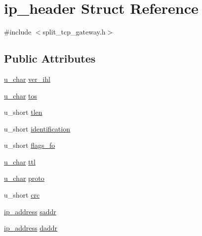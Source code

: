 \hypertarget{structip__header}{\section{ip\-\_\-header \-Struct \-Reference}
\label{structip__header}
}


{\ttfamily \#include $<$split\-\_\-tcp\-\_\-gateway.\-h$>$}

\subsection*{\-Public \-Attributes}
\begin{DoxyCompactItemize}
\item 
\hyperlink{split__tcp__gateway_8h_ae2b02ed168fc99cff3851603910b1fb6}{u\-\_\-char} \hyperlink{structip__header_a5eb344fea96865ef5757d712a23274b4}{ver\-\_\-ihl}
\item 
\hyperlink{split__tcp__gateway_8h_ae2b02ed168fc99cff3851603910b1fb6}{u\-\_\-char} \hyperlink{structip__header_a14c3d2a74ce954f35be8c4353122c188}{tos}
\item 
u\-\_\-short \hyperlink{structip__header_a551538f84a5cdac3e0accc9551c22793}{tlen}
\item 
u\-\_\-short \hyperlink{structip__header_a076993a245f166daecc00e5526d1e3a1}{identification}
\item 
u\-\_\-short \hyperlink{structip__header_ac55a50eeceb2167dc1e13b12b4644920}{flags\-\_\-fo}
\item 
\hyperlink{split__tcp__gateway_8h_ae2b02ed168fc99cff3851603910b1fb6}{u\-\_\-char} \hyperlink{structip__header_aefda609a054b2e0442ec676317ba5650}{ttl}
\item 
\hyperlink{split__tcp__gateway_8h_ae2b02ed168fc99cff3851603910b1fb6}{u\-\_\-char} \hyperlink{structip__header_a6f82f74102352fb10e179da3c7faffde}{proto}
\item 
u\-\_\-short \hyperlink{structip__header_a5c25739369b6383e236ea81e840eabd7}{crc}
\item 
\hyperlink{structip__address}{ip\-\_\-address} \hyperlink{structip__header_a7171ecc414f6c8c972fe2e70fb189bc3}{saddr}
\item 
\hyperlink{structip__address}{ip\-\_\-address} \hyperlink{structip__header_ac2f83398880dc1299e50da631eb44911}{daddr}
\end{DoxyCompactItemize}


